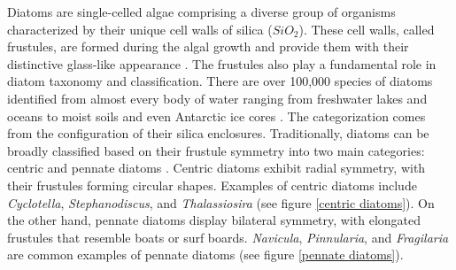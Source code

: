 \documentclass[letterpaper,12pt,oneside]{book}
\begin{document}
Diatoms are single-celled algae comprising a diverse group of organisms characterized by their unique cell walls of silica ($SiO_2$). These cell walls, called frustules, are formed during the algal growth and provide them with their distinctive glass-like appearance \cite{aguirre2018diatomDNAViolet}. The frustules also play a fundamental role in diatom taxonomy and classification. There are over 100,000 species of diatoms identified from almost every body of water ranging from freshwater lakes and oceans
to moist soils and even Antarctic ice cores \cite{iceladregional,aguirre2018diatomDNAViolet}. The categorization comes from the configuration of their silica enclosures. Traditionally, diatoms can be broadly classified based on their frustule symmetry into two main categories: centric and pennate diatoms \cite{diatomworld}. Centric diatoms exhibit radial symmetry, with their frustules forming circular shapes. Examples of centric diatoms include \textit{Cyclotella}, \textit{Stephanodiscus}, and \textit{Thalassiosira} (see figure \ref{centric diatoms}). 
On the other hand, pennate diatoms display bilateral symmetry, with elongated frustules that resemble boats or surf boards. %
\textit{Navicula}, \textit{Pinnularia}, and \textit{Fragilaria} are common examples of pennate diatoms (see figure \ref{pennate diatoms}).
\end{document}
